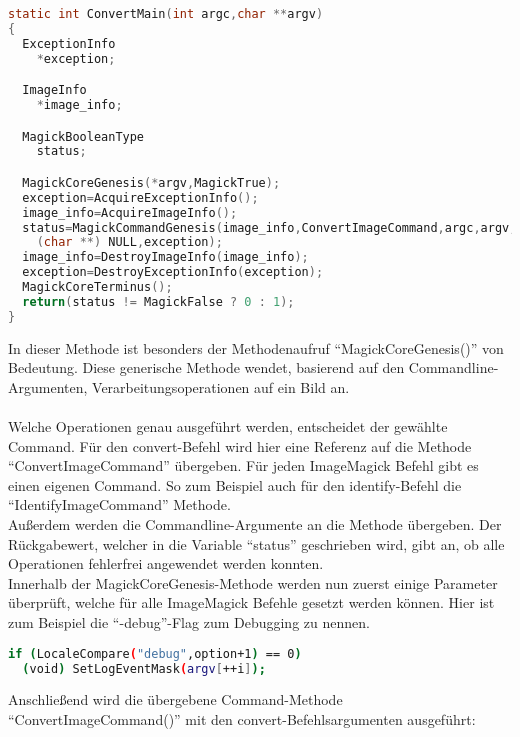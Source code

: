 \begin{lstlisting}[firstnumber=67, language=C, caption=utilities/convert.c ConvertMain(),label={lst:lstlisting}]
static int ConvertMain(int argc,char **argv)
{
  ExceptionInfo
    *exception;

  ImageInfo
    *image_info;

  MagickBooleanType
    status;

  MagickCoreGenesis(*argv,MagickTrue);
  exception=AcquireExceptionInfo();
  image_info=AcquireImageInfo();
  status=MagickCommandGenesis(image_info,ConvertImageCommand,argc,argv,
    (char **) NULL,exception);
  image_info=DestroyImageInfo(image_info);
  exception=DestroyExceptionInfo(exception);
  MagickCoreTerminus();
  return(status != MagickFalse ? 0 : 1);
}
\end{lstlisting}
\vspace{5mm}

In dieser Methode ist besonders der Methodenaufruf "`MagickCoreGenesis()"' von Bedeutung.
Diese generische Methode wendet, basierend auf den Commandline-Argumenten,  Verarbeitungsoperationen auf ein Bild an.\\\\
Welche Operationen genau ausgeführt werden, entscheidet der gewählte Command.
Für den convert-Befehl wird hier eine Referenz auf die Methode "`ConvertImageCommand"' übergeben.
Für jeden ImageMagick Befehl gibt es einen eigenen Command.
So zum Beispiel auch für den identify-Befehl die "`IdentifyImageCommand"' Methode.\\

Außerdem werden die Commandline-Argumente an die Methode übergeben.
Der Rückgabewert, welcher in die Variable "`status"' geschrieben wird, gibt an, ob alle Operationen fehlerfrei angewendet werden konnten.\\

Innerhalb der MagickCoreGenesis-Methode werden nun zuerst einige Parameter überprüft, welche für alle ImageMagick Befehle gesetzt werden können.
Hier ist zum Beispiel die "`-debug"'-Flag zum Debugging zu nennen.

\begin{lstlisting}[firstnumber=158, language=Bash, caption=wand/migrify.c Debugging Flag in der MagickCoreGenesis-Methode,label={lst:migrifydebug}]
if (LocaleCompare("debug",option+1) == 0)
  (void) SetLogEventMask(argv[++i]);
\end{lstlisting}
\vspace{5mm}

Anschließend wird die übergebene Command-Methode "`ConvertImageCommand()"' mit den convert-Befehlsargumenten ausgeführt:

